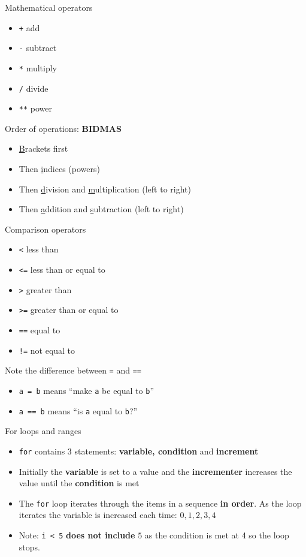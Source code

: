 \begin{frame}{Mathematical operators}
\begin{itemize}
\item \lstinline{+} add
\item \lstinline{-} subtract
\item \lstinline{*} multiply
\item \lstinline{/} divide
\item \lstinline{**} power
\end{itemize}
 Order of operations: \textbf{BIDMAS}
\begin{itemize}
\item \uline{B}rackets first
\item Then \uline{i}ndices (powers)
\item Then \uline{d}ivision and \uline{m}ultiplication (left to right)
\item Then \uline{a}ddition and \uline{s}ubtraction (left to right)
\end{itemize}
\end{frame}

\begin{frame}{Comparison operators}
\begin{itemize}
\item \lstinline{<} less than
\item \lstinline{<=} less than or equal to
\item \lstinline{>} greater than
\item \lstinline{>=} greater than or equal to
\item \lstinline{==} equal to
\item \lstinline{!=} not equal to
\end{itemize}
 Note the difference between \lstinline{=} and \lstinline{==}
\begin{itemize}
\item \lstinline{a = b} means ``make \lstinline{a} be equal to \lstinline{b}''
\item \lstinline{a == b} means ``is \lstinline{a} equal to \lstinline{b}?''
\end{itemize}
\end{frame}

\begin{frame}{For loops and ranges}

\begin{itemize}
\item \lstinline{for} contains 3 statements: \textbf{variable, condition} and \textbf{increment}
\item Initially the  \textbf{variable} is set to a value and the  \textbf{incrementer} increases the value until the  \textbf{condition} is met
\item The \lstinline{for} loop iterates through the items in a sequence \textbf{in order}. As the loop iterates the variable is increased each time: $0, 1, 2, 3, 4$
\item Note: \lstinline{i < 5} \textbf{does not include} $5$ as the condition is met at 4 so the loop stops.
\end{itemize}
\end{frame}


